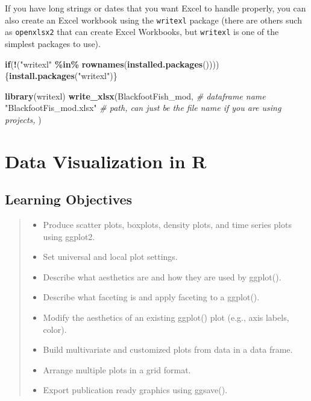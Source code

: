 \documentclass[
  10pt,
  letterpaper,
  twoside,
  openright]{book}
\newenvironment{Shaded}{\begin{snugshade}}{\end{snugshade}}
\newcommand{\CommentTok}[1]{\textcolor[rgb]{0.56,0.35,0.01}{\textit{#1}}}
\newcommand{\ControlFlowTok}[1]{\textcolor[rgb]{0.13,0.29,0.53}{\textbf{#1}}}
\newcommand{\FunctionTok}[1]{\textcolor[rgb]{0.13,0.29,0.53}{\textbf{#1}}}
\newcommand{\NormalTok}[1]{#1}
\newcommand{\SpecialCharTok}[1]{\textcolor[rgb]{0.81,0.36,0.00}{\textbf{#1}}}
\newcommand{\StringTok}[1]{\textcolor[rgb]{0.31,0.60,0.02}{#1}}
\providecommand{\tightlist}{%
  \setlength{\itemsep}{0pt}\setlength{\parskip}{0pt}}
\begin{document}
If you have long strings or dates that you want Excel to handle
properly, you can also create an Excel workbook using the
\texttt{writexl} package (there are others such as \texttt{openxlsx2}
that can create Excel Workbooks, but \texttt{writexl} is one of the
simplest packages to use).

\begin{Shaded}
\begin{Highlighting}[]
\ControlFlowTok{if}\NormalTok{(}\SpecialCharTok{!}\NormalTok{(}\StringTok{"writexl"} \SpecialCharTok{\%in\%} \FunctionTok{rownames}\NormalTok{(}\FunctionTok{installed.packages}\NormalTok{())))\{}\FunctionTok{install.packages}\NormalTok{(}\StringTok{"writexl"}\NormalTok{)\}}

\FunctionTok{library}\NormalTok{(writexl)}
\FunctionTok{write\_xlsx}\NormalTok{(BlackfootFish\_mod, }\CommentTok{\# dataframe name}
          \StringTok{"BlackfootFis\_mod.xlsx"} \CommentTok{\# path, can just be the file name if you are using projects,}
\NormalTok{          )}
\end{Highlighting}
\end{Shaded}

\hypertarget{data-visualization-in-r}{%
\chapter{Data Visualization in R}\label{data-visualization-in-r}}

\hypertarget{learning-objectives-1}{%
\section{Learning Objectives}\label{learning-objectives-1}}

\begin{quote}
\begin{itemize}
\tightlist
\item
  Produce scatter plots, boxplots, density plots, and time series plots
  using ggplot2.
\item
  Set universal and local plot settings.
\item
  Describe what aesthetics are and how they are used by ggplot().
\item
  Describe what faceting is and apply faceting to a ggplot().
\item
  Modify the aesthetics of an existing ggplot() plot (e.g., axis labels,
  color).
\item
  Build multivariate and customized plots from data in a data frame.
\item
  Arrange multiple plots in a grid format.
\item
  Export publication ready graphics using ggsave().
\end{itemize}
\end{quote}
\end{document}
